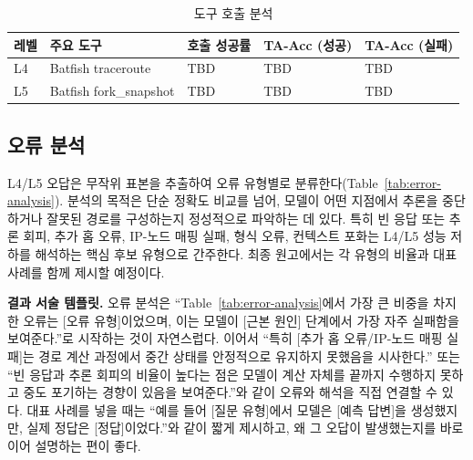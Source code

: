 \documentclass[journal]{IEEEtran}
\begin{document}
\begin{table}[!t]
  \caption{도구 호출 분석}
  \label{tab:tool-call-analysis}
  \centering
  \small
  \begin{tabular}{|C{1.2cm}|L{4.0cm}|C{2.0cm}|C{2.0cm}|C{2.0cm}|}
    \hline
    \textbf{레벨} & \textbf{주요 도구}         & \textbf{호출 성공률} & \textbf{TA-Acc (성공)} & \textbf{TA-Acc (실패)} \\
    \hline
    L4          & Batfish traceroute     & TBD             & TBD                  & TBD                  \\
    \hline
    L5          & Batfish fork\_snapshot & TBD             & TBD                  & TBD                  \\
    \hline
  \end{tabular}
\end{table}

\subsection{오류 분석}
L4/L5 오답은 무작위 표본을 추출하여 오류 유형별로 분류한다(Table~\ref{tab:error-analysis}). 분석의 목적은 단순 정확도 비교를 넘어, 모델이 어떤 지점에서 추론을 중단하거나 잘못된 경로를 구성하는지 정성적으로 파악하는 데 있다. 특히 빈 응답 또는 추론 회피, 추가 홉 오류, IP-노드 매핑 실패, 형식 오류, 컨텍스트 포화는 L4/L5 성능 저하를 해석하는 핵심 후보 유형으로 간주한다. 최종 원고에서는 각 유형의 비율과 대표 사례를 함께 제시할 예정이다.

\textbf{결과 서술 템플릿.} 오류 분석은 ``Table~\ref{tab:error-analysis}에서 가장 큰 비중을 차지한 오류는 [오류 유형]이었으며, 이는 모델이 [근본 원인] 단계에서 가장 자주 실패함을 보여준다.''로 시작하는 것이 자연스럽다. 이어서 ``특히 [추가 홉 오류/IP-노드 매핑 실패]는 경로 계산 과정에서 중간 상태를 안정적으로 유지하지 못했음을 시사한다.'' 또는 ``빈 응답과 추론 회피의 비율이 높다는 점은 모델이 계산 자체를 끝까지 수행하지 못하고 중도 포기하는 경향이 있음을 보여준다.''와 같이 오류와 해석을 직접 연결할 수 있다. 대표 사례를 넣을 때는 ``예를 들어 [질문 유형]에서 모델은 [예측 답변]을 생성했지만, 실제 정답은 [정답]이었다.''와 같이 짧게 제시하고, 왜 그 오답이 발생했는지를 바로 이어 설명하는 편이 좋다.
\end{document}
